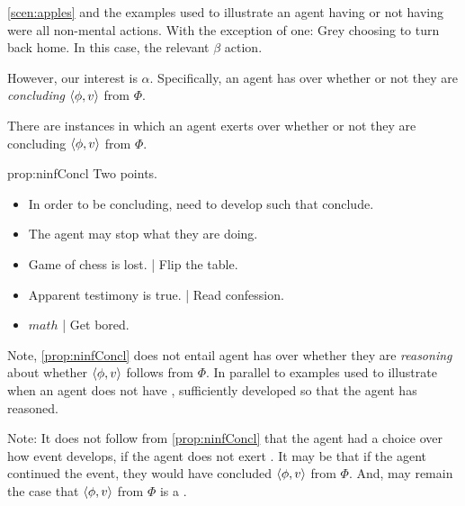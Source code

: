 \begin{note}
  \nocite{Peacocke:2021aa}
  \autoref{scen:apples} and the examples used to illustrate an agent having or not having \ninf{} were all non-mental actions.
  With the exception of one:
  Grey choosing to turn back home.
  In this case, the relevant \(\beta\) action.

  However, our interest is \(\alpha\).
  Specifically, an agent has \ninf{} over whether or not they are \emph{concluding} \(\langle \phi, v \rangle\) from \(\Phi\).

  \begin{proposition}
    \label{prop:ninfConcl}
    There are instances in which an agent exerts  over whether or not they are concluding \(\langle \phi, v \rangle\) from \(\Phi\).
  \end{proposition}

  \begin{argument}{prop:ninfConcl}
    Two points.
    \begin{itemize}[noitemsep]
    \item
      In order to be concluding, need to develop such that conclude.
    \item
      The agent may stop what they are doing.
    \end{itemize}
  \end{argument}

  \begin{note}
    \begin{itemize}
    \item
      Game of chess is lost. | Flip the table.
    \item
      Apparent testimony is true. | Read confession.
    \item
      \(math\) | Get bored.
    \end{itemize}
  \end{note}
\end{note}

\begin{note}
  Note, \autoref{prop:ninfConcl} does not entail agent has \ninf{} over whether they are \emph{reasoning} about whether \(\langle \phi, v \rangle\) follows from \(\Phi\).
  In parallel to examples used to illustrate when an agent does not have \ninf{}, sufficiently developed so that the agent has reasoned.

  Note:
  It does not follow from \autoref{prop:ninfConcl} that the agent had a choice over how event develops, if the agent does not exert \ninf{}.
  It may be that if the agent continued the event, they would have concluded \(\langle \phi, v \rangle\) from \(\Phi\).
  And, may remain the case that \(\langle \phi, v \rangle\) from \(\Phi\) is a \fc{}.
\end{note}

